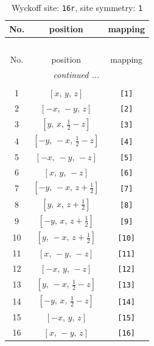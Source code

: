\documentclass[fleqn,8pt]{jsarticle}
\begin{document}
\begin{longtable}{ccc}
\caption{Wyckoff site: {\tt 16r}, site symmetry: {\tt 1}}
 \\
 \hline \hline
No. & position & mapping \\ \hline \endfirsthead

\multicolumn{2}{l}{\tablename\ \thetable{}} \\
 \hline \hline
No. & position & mapping \\ \hline \endhead

 \hline \hline
\multicolumn{2}{r}{\footnotesize\it continued ...} \\ \endfoot

 \hline \hline
\multicolumn{2}{r}{} \\ \endlastfoot

1 & $\left[ x,\, y,\, z \right]$ & {\tt [1]} \\ \hline
2 & $\left[ - x,\, - y,\, z \right]$ & {\tt [2]} \\ \hline
3 & $\left[ y,\, x,\, \frac{1}{2} - z \right]$ & {\tt [3]} \\ \hline
4 & $\left[ - y,\, - x,\, \frac{1}{2} - z \right]$ & {\tt [4]} \\ \hline
5 & $\left[ - x,\, - y,\, - z \right]$ & {\tt [5]} \\ \hline
6 & $\left[ x,\, y,\, - z \right]$ & {\tt [6]} \\ \hline
7 & $\left[ - y,\, - x,\, z + \frac{1}{2} \right]$ & {\tt [7]} \\ \hline
8 & $\left[ y,\, x,\, z + \frac{1}{2} \right]$ & {\tt [8]} \\ \hline
9 & $\left[ - y,\, x,\, z + \frac{1}{2} \right]$ & {\tt [9]} \\ \hline
10 & $\left[ y,\, - x,\, z + \frac{1}{2} \right]$ & {\tt [10]} \\ \hline
11 & $\left[ x,\, - y,\, - z \right]$ & {\tt [11]} \\ \hline
12 & $\left[ - x,\, y,\, - z \right]$ & {\tt [12]} \\ \hline
13 & $\left[ y,\, - x,\, \frac{1}{2} - z \right]$ & {\tt [13]} \\ \hline
14 & $\left[ - y,\, x,\, \frac{1}{2} - z \right]$ & {\tt [14]} \\ \hline
15 & $\left[ - x,\, y,\, z \right]$ & {\tt [15]} \\ \hline
16 & $\left[ x,\, - y,\, z \right]$ & {\tt [16]} \\
\end{longtable}
\end{document}

